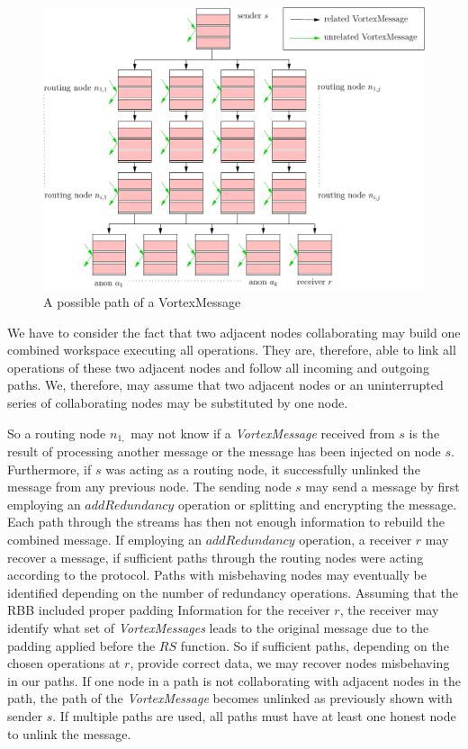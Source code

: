\documentclass[acmsmall, screen, review]{acmart}
\begin{document}
	\begin{figure}[ht]
		\centering\includegraphics[width=0.7\columnwidth]{messagePaths}
		\caption{A possible path of a VortexMessage}
		\label{fig:messagePaths}
	\end{figure}
	
	We have to consider the fact that two adjacent nodes collaborating may build one combined workspace executing all operations. They are, therefore, able to link all operations of these two adjacent nodes and follow all incoming and outgoing paths. We, therefore, may assume that two adjacent nodes or an uninterrupted series of collaborating nodes may be substituted by one node.
	
	So a routing node $n_{1,}$ may not know if a \emph{VortexMessage} received from $s$ is the result of processing another message or the message has been injected on node $s$. Furthermore, if $s$ was acting as a routing node, it successfully unlinked the message from any previous node. The sending node $s$ may send a message by first employing an $addRedundancy$ operation or splitting and encrypting the message. Each path through the streams has then not enough information to rebuild the combined message. If employing an $addRedundancy$ operation, a receiver $r$ may recover a message, if sufficient paths through the routing nodes were acting according to the protocol. Paths with misbehaving nodes may eventually be identified depending on the number of redundancy operations. Assuming that the RBB included proper padding Information for the receiver $r$, the receiver may identify what set of \emph{VortexMessages} leads to the original message due to the padding applied before the $RS$ function. So if sufficient paths, depending on the chosen operations at $r$, provide correct data, we may recover nodes misbehaving in our paths. If one node in a path is not collaborating with adjacent nodes in the path, the path of the \emph{VortexMessage} becomes unlinked as previously shown with sender $s$. If multiple paths are used, all paths must have at least one honest node to unlink the message. 
	
\end{document}

